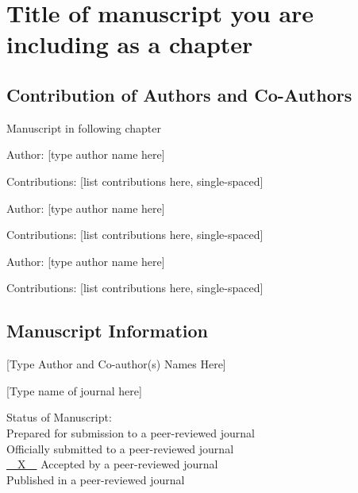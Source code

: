 
\chapter{Title of manuscript you are\\ including as a chapter}\label{CH:manuscript}

\section{Contribution of Authors and Co-Authors}

Manuscript in following chapter

Author: [type author name here]

Contributions: [list contributions here, single-spaced]

Author: [type author name here]

Contributions: [list contributions here, single-spaced]

Author: [type author name here]

Contributions: [list contributions here, single-spaced]


\newpage

\section{Manuscript Information}

[Type Author and Co-author(s) Names Here]

[Type name of journal here]

\begin{singlespace}
  Status of Manuscript: \\\indent %
  \underline{\phantom{~~X~~}} Prepared for submission to a peer-reviewed journal\\\indent
  \underline{\phantom{~~X~~}} Officially submitted to a peer-reviewed journal\\\indent
  \underline{~~X~~} Accepted by a peer-reviewed journal\\\indent
  \underline{\phantom{~~X~~}} Published in a peer-reviewed journal
\end{singlespace}

